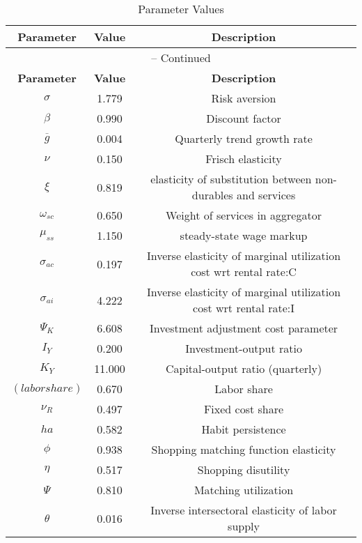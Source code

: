 \begin{center}
\begin{longtable}{ccc}
\caption{Parameter Values}\\%
\toprule%
\multicolumn{1}{c}{\textbf{Parameter}} &
\multicolumn{1}{c}{\textbf{Value}} &
 \multicolumn{1}{c}{\textbf{Description}}\\%
\midrule%
\endfirsthead
\multicolumn{3}{c}{{\tablename} \thetable{} -- Continued}\\%
\midrule%
\multicolumn{1}{c}{\textbf{Parameter}} &
\multicolumn{1}{c}{\textbf{Value}} &
  \multicolumn{1}{c}{\textbf{Description}}\\%
\midrule%
\endhead
${\sigma}$ 	 & 	 1.779 	 & 	 Risk aversion\\
${\beta}$ 	 & 	 0.990 	 & 	 Discount factor\\
${\overline{g}}$ 	 & 	 0.004 	 & 	 Quarterly trend growth rate\\
$\nu$ 	 & 	 0.150 	 & 	 Frisch elasticity\\
$\xi$ 	 & 	 0.819 	 & 	 elasticity of substitution between non-durables and services\\
$\omega_{sc}$ 	 & 	 0.650 	 & 	 Weight of services in aggregator\\
$\mu_{ss}$ 	 & 	 1.150 	 & 	 steady-state wage markup\\
${\sigma_{ac}}$ 	 & 	 0.197 	 & 	 Inverse elasticity of marginal utilization cost wrt rental rate:C\\
${\sigma_{ai}}$ 	 & 	 4.222 	 & 	 Inverse elasticity of marginal utilization cost wrt rental rate:I\\
${\Psi_{K}}$ 	 & 	 6.608 	 & 	 Investment adjustment cost parameter\\
${I_Y}$ 	 & 	 0.200 	 & 	 Investment-output ratio\\
${K_Y}$ 	 & 	 11.000 	 & 	 Capital-output ratio (quarterly)\\
$(labor share)$ 	 & 	 0.670 	 & 	 Labor share\\
${\nu_R}$ 	 & 	 0.497 	 & 	 Fixed cost share\\
${ha}$ 	 & 	 0.582 	 & 	 Habit persistence\\
${\phi}$ 	 & 	 0.938 	 & 	 Shopping matching function elasticity\\
${\eta}$ 	 & 	 0.517 	 & 	 Shopping disutility\\
${\Psi}$ 	 & 	 0.810 	 & 	 Matching utilization\\
${\theta}$ 	 & 	 0.016 	 & 	 Inverse intersectoral elasticity of labor supply\\

\end{longtable}
\end{center}
